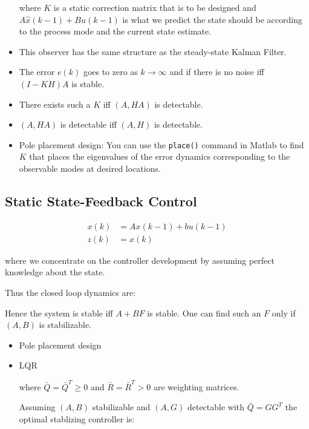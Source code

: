 \documentclass[10pt,a4paper]{scrartcl}
\begin{document}
\begin{multicols*}{2}
\begin{multicols*}{3}
\begin{itemize}
where $K$ is a static correction matrix that is to be designed and $A\hat{x}(k-1)+Bu(k-1)$ is what we predict the state should be according to the process mode and the current state estimate.
\item This observer has the same structure as the steady-state Kalman Filter.
\item The error $e(k)$ goes to zero as $k\rightarrow\infty$ and if there is no noise iff $(I-KH)A$ is stable.
\item There exists such a $K$ iff $(A,HA)$ is detectable.
\item $(A,HA)$ is detectable iff $(A,H)$ is detectable.
\item Pole placement design: You can use the \verb+place()+ command in Matlab to find $K$ that places the eigenvalues of the error dynamics corresponding to the observable modes at desired locations.
\end{itemize}

\subsection{Static State-Feedback Control}

\begin{align*}
x(k)&=Ax(k-1)+bu(k-1)\\
z(k)&=x(k)
\end{align*}

where we concentrate on the controller development by assuming perfect knowledge about the state.


Thus the closed loop dynamics are:


Hence the system is stable iff $A+BF$ is stable. One can find such an $F$ only if $(A,B)$ is stabilizable.

\begin{itemize}
\item Pole placement design
\item LQR


where $\bar{Q}=\bar{Q}^T\geq 0$ and $\bar{R}=\bar{R}^T>0$ are weighting matrices.

Assuming $(A,B)$ stabilizable and $(A,G)$ detectable with $\bar{Q}=GG^T$ the optimal stablizing controller is:



\end{itemize}
\end{multicols*}
\end{multicols*}
\end{document}
